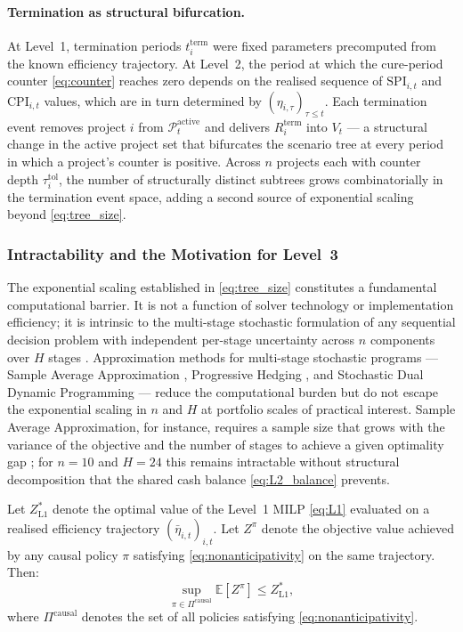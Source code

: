 \paragraph{Termination as structural bifurcation.}
At Level~1, termination periods $t_i^{\mathrm{term}}$ were fixed
parameters precomputed from the known efficiency trajectory. At
Level~2, the period at which the cure-period counter
\eqref{eq:counter} reaches zero depends on the realised sequence of
$\mathrm{SPI}_{i,t}$ and $\mathrm{CPI}_{i,t}$ values, which are in
turn determined by $(\eta_{i,\tau})_{\tau \leq t}$. Each termination
event removes project $i$ from $\mathcal{P}_t^{\mathrm{active}}$ and
delivers $R_i^{\mathrm{term}}$ into $V_t$ --- a structural change in the
active project set that bifurcates the scenario tree at every period
in which a project's counter is positive. Across $n$ projects each
with counter depth $\tau_i^{\mathrm{tol}}$, the number of
structurally distinct subtrees grows combinatorially in the
termination event space, adding a second source of exponential scaling
beyond \eqref{eq:tree_size}.

\subsubsection{Intractability and the Motivation for Level~3}
\label{subsubsec:l2_intractability}

The exponential scaling established in \eqref{eq:tree_size} constitutes
a fundamental computational barrier. It is not a function of solver
technology or implementation efficiency; it is intrinsic to the
multi-stage stochastic formulation of any sequential decision problem
with independent per-stage uncertainty across $n$ components over $H$
stages \citep{Birge2011}. Approximation methods for multi-stage
stochastic programs --- Sample Average Approximation \citep{Kleywegt2002},
Progressive Hedging \citep{Rockafellar1991}, and Stochastic Dual
Dynamic Programming \citep{Pereira1991} --- reduce the computational
burden but do not escape the exponential scaling in $n$ and $H$ at
portfolio scales of practical interest. Sample Average Approximation,
for instance, requires a sample size that grows with the variance of
the objective and the number of stages to achieve a given optimality
gap \citep{Kleywegt2002}; for $n = 10$ and $H = 24$ this remains
intractable without structural decomposition that the shared cash
balance \eqref{eq:L2_balance} prevents.

\begin{proposition}
\label{prop:upper_bound}
Let $Z^*_{\mathrm{L1}}$ denote the optimal value of the Level~1 MILP
\eqref{eq:L1} evaluated on a realised efficiency trajectory
$(\bar{\eta}_{i,t})_{i,t}$. Let $Z^\pi$ denote the objective value
achieved by any causal policy $\pi$ satisfying
\eqref{eq:nonanticipativity} on the same trajectory. Then:
\begin{equation}
  \sup_{\pi \in \Pi^{\mathrm{causal}}}
    \mathbb{E}\!\left[Z^\pi\right]
  \leq Z^*_{\mathrm{L1}},
  \label{eq:upper_bound}
\end{equation}
where $\Pi^{\mathrm{causal}}$ denotes the set of all policies
satisfying \eqref{eq:nonanticipativity}.
\end{proposition}

